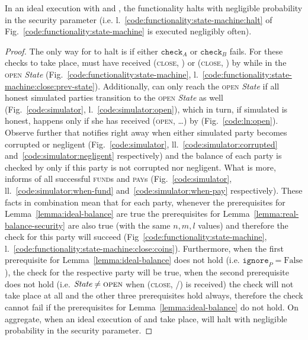 \begin{lemma}[No halt]
\label{lemma:no-halt}
  In an ideal execution with \fchan and \simulator, the functionality halts with
  negligible probability in the security parameter (i.e.
  l.~\ref{code:functionality:state-machine:halt} of
  Fig.~\ref{code:functionality:state-machine} is executed negligibly often).
\end{lemma}

\begin{proof}
  The only way for \fchan to halt is if either $\texttt{check}_A$ or
  $\texttt{check}_B$ fails. For these checks to take place, \fchan must have
  received (\textsc{close}, \alice) or (\textsc{close}, \bob) by \simulator
  while in the \textsc{open} \textit{State}
  (Fig.~\ref{code:functionality:state-machine},
  l.~\ref{code:functionality:state-machine:close:prev-state}). Additionally,
  \fchan can only reach the \textsc{open} \textit{State} if all honest simulated
  parties transition to the \textsc{open} \textit{State} as well
  (Fig.~\ref{code:simulator}, l.~\ref{code:simulator:open}), which in turn, if
  simulated \alice is honest, happens only if she has received (\textsc{open},
  \dots) by \environment (Fig.~\ref{code:ln:open}). Observe further that
  \simulator notifies \fchan right away when either simulated party becomes
  corrupted or negligent (Fig.~\ref{code:simulator},
  ll.~\ref{code:simulator:corrupted} and~\ref{code:simulator:negligent}
  respectively) and the balance of each party is checked by \fchan only if this
  party is not corrupted nor negligent. What is more, \simulator informs \fchan
  of all successful \textsc{fund}s and \textsc{pay}s (Fig.~\ref{code:simulator},
  ll.~\ref{code:simulator:when-fund} and~\ref{code:simulator:when-pay}
  respectively). These facts in combination mean that for each party, whenever
  the prerequisites for Lemma~\ref{lemma:ideal-balance} are true the
  prerequisites for Lemma~\ref{lemma:real-balance-security} are also true (with
  the same $n, m, l$ values) and therefore the check for this party will succeed
  (Fig~\ref{code:functionality:state-machine},
  l.~\ref{code:functionality:state-machine:close:coins}). Furthermore, when the
  first prerequisite for Lemma~\ref{lemma:ideal-balance} does not hold (i.e.
  $\texttt{ignore}_P = \mathrm{False}$), the check for the respective party will
  be true, when the second prerequisite does not hold (i.e. $\textit{State} \neq
  \textsc{open}$ when (\textsc{close}, \alice/\bob) is received) the check will
  not take place at all and the other three prerequisites hold always, therefore
  the check cannot fail if the prerequisites for Lemma~\ref{lemma:ideal-balance}
  do not hold. On aggregate, when an ideal execution of \fchan and \simulator
  take place, \fchan will halt with negligible probability in the security
  parameter.
\end{proof}

